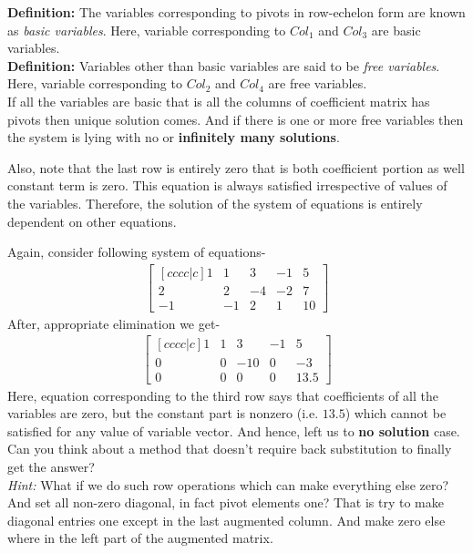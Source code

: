 \documentclass{article}
\begin{document}
\textbf{Definition:} The variables corresponding to pivots in row-echelon form are known as \textit{basic variables}. Here, variable corresponding to $Col_1$ and $Col_3$ are basic variables.\\

\textbf{Definition:} Variables other than basic variables are said to be \textit{free variables}.  Here, variable corresponding to $Col_2$ and $Col_4$ are free variables.\\


If all the variables are basic that is all the columns of coefficient matrix has pivots then unique solution comes. And if there is one or more free variables then the system is lying with no or \textbf{infinitely many solutions}.

Also, note that the last row is entirely zero that is both coefficient portion as well constant term is zero. This equation is always satisfied irrespective of values of the variables. Therefore, the solution of the system of equations is entirely dependent on other equations.

Again, consider following system of equations-\\
\begin{align}
\begin{bmatrix}[cccc|c] 
1 & 1 & 3 & -1 & 5 \\
2 & 2 & -4 & -2 & 7 \\
-1 & -1 & 2 & 1 & 10 
\end{bmatrix}\nonumber
\end{align}
After, appropriate elimination we get-
\begin{align}
\begin{bmatrix}[cccc|c] 
1 & 1 & 3 & -1 & 5 \\
0 & 0 & -10 & 0 & -3 \\
0 & 0 & 0 & 0 & 13.5 
\end{bmatrix}\nonumber
\end{align}
Here, equation corresponding to the third row says that coefficients of all the variables are zero, but the constant part is nonzero (i.e. $13.5$) which cannot be satisfied for any value of variable vector. And hence, left us to \textbf{no solution} case.\\
Can you think about a method that doesn't require back substitution to finally get the answer?\\
\textit{Hint:} What if we do such row operations which can make everything else zero? And set all non-zero diagonal, in fact pivot elements one? That is try to make diagonal entries one except in the last augmented column. And make zero else where in the left part of the augmented matrix.\\
\end{document}
